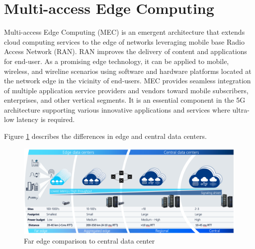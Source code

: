 \section{Multi-access Edge Computing}

Multi-access Edge Computing (MEC) is an emergent architecture that extends cloud computing services to the edge of networks leveraging mobile base Radio Access Network (RAN). RAN improves the delivery of content and applications for end-user. As a promising edge technology, it can be applied to mobile, wireless, and wireline scenarios using software and hardware platforms located at the network edge in the vicinity of end-users. MEC provides seamless integration of multiple application service providers and vendors toward mobile subscribers, enterprises, and other vertical segments. It is an essential component in the 5G architecture supporting various innovative applications and services where ultra-low latency is required. \cite{Abbas2018}

Figure \ref{fig:AirFrame} describes the differences in edge and central data centers.

\begin{figure}[ht]
  \begin{center}
    \includegraphics[width=13.5cm]{images/AirFrame.png}
    \caption{Far edge comparison to central data center \cite{AirFrameOpenEdgeServer}}
    \label{fig:AirFrame}
  \end{center}
\end{figure}

